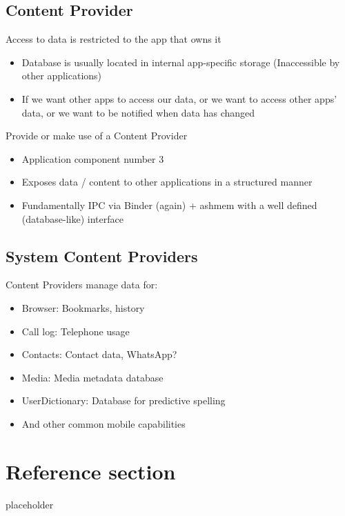 \documentclass{article}
\begin{document}
\subsection{Content	Provider}
\begin{flushleft}
Access to data is restricted to the app that owns it
\begin{itemize}
  \item Database is usually located in internal app-specific storage (Inaccessible by other applications)
  \item If we want other apps to access our data, or we want to access other apps’ data, or we want to be notified when data has changed
\end{itemize}
Provide or make use of a Content Provider
\begin{itemize}
  \item Application component number 3 
  \item Exposes data / content to other applications in a structured manner 
  \item Fundamentally IPC via Binder (again) + ashmem with a well defined (database-like) interface
\end{itemize}
\end{flushleft}

\subsection{System Content Providers}

\begin{flushleft}
Content Providers manage data for:
\begin{itemize}
  \item Browser: Bookmarks, history
  \item Call log: Telephone usage
  \item Contacts: Contact data, WhatsApp?
  \item Media: Media metadata database
  \item UserDictionary: Database for predictive spelling
  \item And other common mobile capabilities
\end{itemize}
\end{flushleft}

\pagebreak
\section*{Reference section} \label{sec:reference}
\begin{description}
	\item[placeholder] \hfill \\
\end{description}
\end{document}
